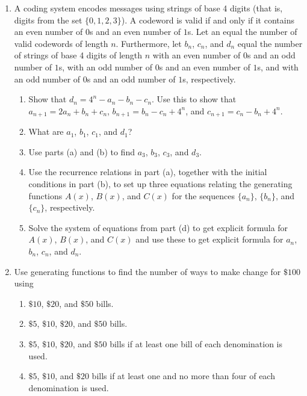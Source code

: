 \documentclass{../../cls/sig-alternate-05-2015}
\begin{document}
\begin{enumerate}
    \item A coding system encodes messages using strings of
    base 4 digits (that is, digits from the set $\{0, 1, 2, 3\}$). A codeword is valid if and only if it contains an even
    number of $0$s and an even number of $1$s. Let an equal the number of valid codewords of length $n$. Furthermore, let $b_n$, $c_n$, and $d_n$ equal the number of strings of base 4 digits of length $n$ with an even number of $0$s and an odd number of $1$s, with an odd number of $0$s and an even number of $1$s, and with an odd number of $0$s and an odd number of $1$s, respectively. \begin{enumerate}
        \item Show that $d_n = 4^n - a_n - b_n - c_n$. Use this to show that $a_{n+1} = 2a_n + b_n + c_n$, $b_{n+1} = b_n - c_n + 4^n$, and $c_{n+1} = c_n - b_n + 4^n$.
        \item What are $a_1$, $b_1$, $c_1$, and $d_1$?
        \item Use parts (a) and (b) to find $a_3$, $b_3$, $c_3$, and $d_3$.
        \item Use the recurrence relations in part (a), together with the initial conditions in part (b), to set up three equations relating the generating functions $A(x)$, $B(x)$, and $C(x)$ for the sequences $\{a_n\}$, $\{b_n\}$, and $\{c_n\}$, respectively.
        \item Solve the system of equations from part (d) to get explicit formula for $A(x)$, $B(x)$, and $C(x)$ and use these to get explicit formula for $a_n$, $b_n$, $c_n$, and $d_n$.
        

    \end{enumerate}
    
    \item Use generating functions to find the number of ways to
    make change for $\$100$ using
    \begin{enumerate}
        \item $\$10$, $\$20$, and $\$50$ bills.
        \item $\$5$, $\$10$, $\$20$, and $\$50$ bills.
        \item $\$5$, $\$10$, $\$20$, and $\$50$ bills if at least one bill of each
        denomination is used.
        \item $\$5$, $\$10$, and $\$20$ bills if at least one and no more than
        four of each denomination is used.
    \end{enumerate}
\end{enumerate}
\end{document}
